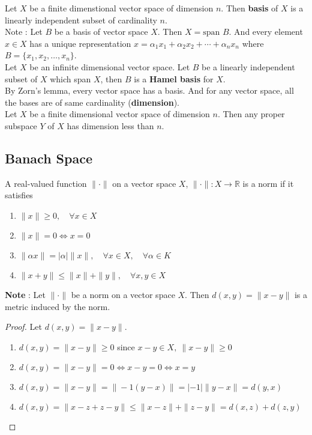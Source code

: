 Let $X$ be a finite dimenstional vector space of dimension $n$.
Then \textbf{basis} of $X$ is a linearly independent subset of cardinality $n$.\\
Note : Let $B$ be a basis of vector space $X$. Then $X = \text{span }B$.
And every element $x \in X$ has a unique representation $x = \alpha_1 x_1 + \alpha_2 x_2 + \dotsb + \alpha_n x_n$ where $B = \{ x_1,x_2,\dots,x_n \}$.\\

Let $X$ be an infinite dimensional vector space.
Let $B$ be a linearly independent subset of $X$ which span $X$, then $B$ is a \textbf{ Hamel basis} for $X$.\\

By Zorn's lemma, every vector space has a basis.
And for any vector space, all the bases are of same cardinality (\textbf{dimension}).\\

Let $X$ be a finite dimensional vector space of dimension $n$.
Then any proper subspace $Y$ of $X$ has dimension less than $n$.

\subsection{Banach Space}
\begin{definition}[norm]
	A real-valued function $\| \cdot \|$ on a vector space $X$, $\| \cdot \| : X \to \mathbb{R}$ is a norm if it satisfies
	\begin{enumerate}
		\item $\| x \| \ge 0,\quad \forall x \in X$
		\item $\| x \| = 0 \iff x = 0$
		\item $\| \alpha x \| = |\alpha| \| x \|,\quad \forall x \in X,\quad \forall \alpha \in K$
		\item $\| x + y \| \le \| x \| + \| y \|,\quad \forall x,y \in X$
	\end{enumerate}
\end{definition}

\textbf{Note} : Let $\| \cdot \|$ be a norm on a vector space $X$.
Then $d(x,y) = \| x -y\|$ is a metric induced by the norm.
\begin{proof}
	Let $d(x,y) = \| x-y \|$.
	\begin{enumerate}
		\item $d(x,y) = \| x-y \| \ge 0$ since $x-y \in X,\ \| x-y \| \ge 0$
		\item $d(x,y) = \| x-y \| = 0 \iff x-y = 0 \iff x = y$
		\item $d(x,y) = \| x-y \| = \| -1(y-x) \| = |-1|\|y-x\| = d(y,x)$
		\item $d(x,y) = \| x -z +z-y\| \le \|x-z\| + \| z-y\| = d(x,z) + d(z,y)$
	\end{enumerate}
\end{proof}

